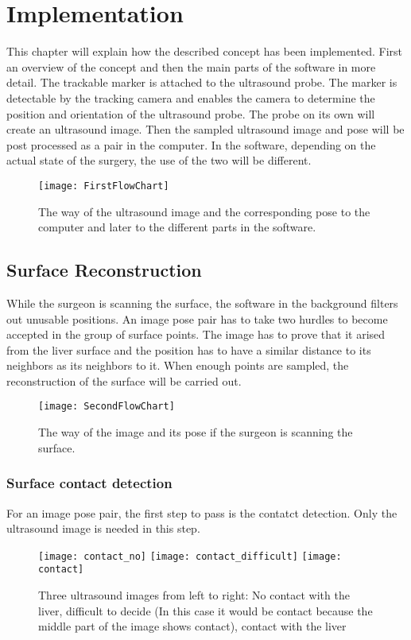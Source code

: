 \chapter{Implementation}
This chapter will explain how the described concept has been implemented.
First an overview of the concept and then the main parts of the software in more
detail.
The trackable marker is attached to the ultrasound probe. The marker is
detectable by the tracking camera and enables the camera to determine the
position and orientation of the ultrasound probe. The probe on its own will
create an ultrasound image. Then the sampled ultrasound image and pose will be
post processed as a pair in the computer. In the software, depending on the
actual state of the surgery, the use of the two will be different.

\begin{figure}[H]
  \centering
 \texttt{[image: FirstFlowChart]}
  \caption{The way of the ultrasound image and the corresponding pose to the
    computer and later to the different parts in the software.}
  \label{fig:FirstFlowChart}
\end{figure}

\section{Surface Reconstruction}
While the surgeon is scanning the surface, the software in the background
filters out unusable positions. An image pose pair has to take two hurdles to
become accepted in the group of surface points. The image has to prove that it
arised from the liver surface and the position has to have a similar distance to
its neighbors as its neighbors to it. 
When enough points are sampled, the reconstruction of the surface will be
carried out.
\begin{figure}[H]
  \centering
 \texttt{[image: SecondFlowChart]}
  \caption{The way of the image and its pose if the surgeon is scanning the
    surface.}
  \label{fig:SecondFlowChart}
\end{figure}

\subsection{Surface contact detection}
For an image pose pair, the first step to pass is the contatct detection. Only
the ultrasound image is needed in this step. 

\begin{figure}[H]
  \centering
  \texttt{[image: contact\_no]}
  \endminipage
  \hfill
  \texttt{[image: contact\_difficult]}
  \endminipage
  \hfill
  \texttt{[image: contact]}
  \endminipage
  \hfill 
 \caption{Three ultrasound images from left to right: No contact with the liver,
   difficult to decide (In this case it would be contact because the middle part
   of the image shows contact), contact with the liver}
  \label{fig:contactVSnocontact}
\end{figure}

